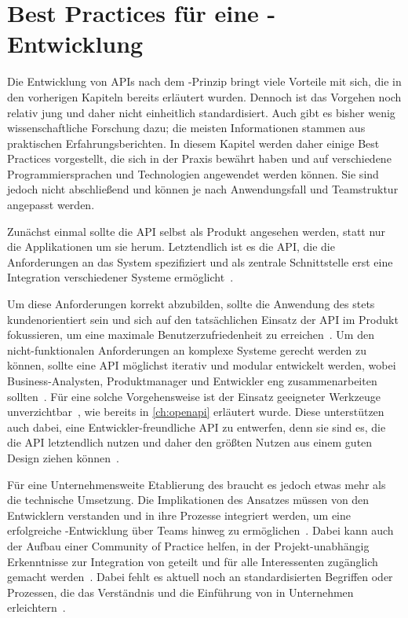 \chapter{Best Practices für eine \AF-Entwicklung}
Die Entwicklung von \acp{API} nach dem \AF-Prinzip bringt viele Vorteile mit sich, die in den vorherigen Kapiteln bereits erläutert wurden.
Dennoch ist das Vorgehen noch relativ jung und daher nicht einheitlich standardisiert.
Auch gibt es bisher wenig wissenschaftliche Forschung dazu; die meisten Informationen stammen aus praktischen Erfahrungsberichten.
In diesem Kapitel werden daher einige Best Practices vorgestellt, die sich in der Praxis bewährt haben und auf verschiedene Programmiersprachen und Technologien angewendet werden können.
Sie sind jedoch nicht abschließend und können je nach Anwendungsfall und Teamstruktur angepasst werden.

Zunächst einmal sollte die \ac{API} selbst als Produkt angesehen werden, statt nur die Applikationen um sie herum.
Letztendlich ist es die \ac{API}, die die Anforderungen an das System spezifiziert und als zentrale Schnittstelle erst eine Integration verschiedener Systeme ermöglicht~\cite[350]{de23}.

Um diese Anforderungen korrekt abzubilden, sollte die Anwendung des \AFAes stets kundenorientiert sein und sich auf den tatsächlichen Einsatz der \ac{API} im Produkt fokussieren, um eine maximale Benutzerzufriedenheit zu erreichen~\cite[1627]{cha21}.
Um den nicht-funktionalen Anforderungen an komplexe Systeme gerecht werden zu können, sollte eine \ac{API} möglichst iterativ und modular entwickelt werden, wobei Business-Analysten, Produktmanager und Entwickler eng zusammenarbeiten sollten~\cite[352]{de23}.
Für eine solche Vorgehensweise ist der Einsatz geeigneter Werkzeuge unverzichtbar~\cite[1628]{cha21}, wie bereits in \autoref{ch:openapi} erläutert wurde.
Diese unterstützen auch dabei, eine Entwickler-freundliche \ac{API} zu entwerfen, denn sie sind es, die die \ac{API} letztendlich nutzen und daher den größten Nutzen aus einem guten Design ziehen können~\cite[355]{de23}.

Für eine Unternehmensweite Etablierung des \AFAes braucht es jedoch etwas mehr als die technische Umsetzung.
Die Implikationen des Ansatzes müssen von den Entwicklern verstanden und in ihre Prozesse integriert werden, um eine erfolgreiche \AF-Entwicklung über Teams hinweg zu ermöglichen~\cite[359]{de23}.
Dabei kann auch der Aufbau einer Community of Practice helfen, in der Projekt-unabhängig Erkenntnisse zur Integration von \AF geteilt und für alle Interessenten zugänglich gemacht werden~\cite[4]{kul23}.
Dabei fehlt es aktuell noch an standardisierten Begriffen oder Prozessen, die das Verständnis und die Einführung von \AF in Unternehmen erleichtern~\cites[77]{bea22}[2]{kul23}.

